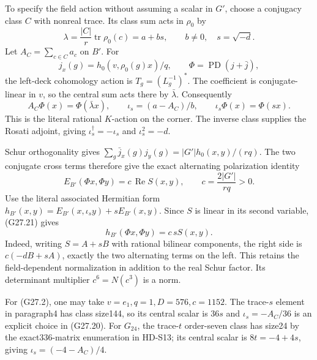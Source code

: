 To specify the field action without assuming a scalar in \(G'\),
choose a conjugacy class \(C\) with nonreal trace.
Its class sum acts in \(\rho_0\) by
\[
       \lambda=\frac{|C|}{r}\operatorname{tr}\rho_0(c)
                    =a+bs,\qquad b\ne0,\quad s=\sqrt{-d}.
\]
Let \(A_C=\sum_{c\in C}a_c\) on \(B'\). For
\[
 j_x(g)=h_0(v,\rho_0(g)x)/q,\qquad
                    \Phi=\operatorname{PD}(j+\bar j),
\]
the left-deck cohomology action is \(T_g=(L_g^{-1})^*\).
The coefficient is conjugate-linear in \(v\), so the central
sum acts there by \(\bar\lambda\). Consequently
\[
 A_C\Phi(x)=\Phi(\bar\lambda x),\qquad
       \iota_s=(a-A_C)/b,\qquad \iota_s\Phi(x)=\Phi(sx).
                                                               \tag{G27.20}
\]
This is the literal rational \(K\)-action on the corner.
The inverse class supplies the Rosati adjoint, giving
\(\iota_s^\dagger=-\iota_s\) and \(\iota_s^2=-d\).

Schur orthogonality gives
\(\sum_g\bar j_x(g)j_y(g)=|G'|h_0(x,y)/(rq)\).
The two conjugate cross terms therefore give the exact
alternating polarization identity
\[
 E_{B'}(\Phi x,\Phi y)=c\,\operatorname{Re}S(x,y),
                 \qquad c=\frac{2|G'|}{rq}>0.
                                                               \tag{G27.21}
\]
Use the literal associated Hermitian form
\(h_{B'}(x,y)=E_{B'}(x,\iota_s y)+sE_{B'}(x,y)\).
Since \(S\) is linear in its second variable, (G27.21) gives
\[
                h_{B'}(\Phi x,\Phi y)=c\,sS(x,y).            \tag{G27.22}
\]
Indeed, writing \(S=A+sB\) with rational bilinear components,
the right side is \(c(-dB+sA)\), exactly the two alternating
terms on the left. This retains the field-dependent
normalization in addition to the real Schur factor.
Its determinant multiplier \(c^6=N(c^3)\) is a norm.

For (G27.2), one may take \(v=e_1,q=1,D=576,c=1152\).
The trace-\(s\) element in paragraph4 has class size144,
so its central scalar is \(36s\) and
\(\iota_s=-A_C/36\) is an explicit choice in (G27.20).
For \(G_{24}\), the trace-\(t\) order-seven class has
size24 by the exact336-matrix enumeration in HD-S13;
its central scalar is \(8t=-4+4s\), giving
\(\iota_s=(-4-A_C)/4\).

